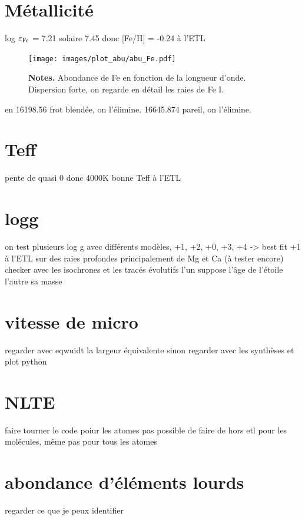 \section{Métallicité}

log $\varepsilon_{\rm Fe}$ = 7.21
solaire 7.45 
donc [Fe/H] = -0.24 à l'ETL 

\begin{figure}[htbp]
  \begin{center}
  \texttt{[image: images/plot\_abu/abu\_Fe.pdf]}
  \end{center}
  \textbf{Notes.}  Abondance de Fe en fonction de la longueur d'onde. Dispersion forte, on regarde en détail les raies de Fe I.
  \label{fig:abu_Fe}
\end{figure}
en 16198.56 frot blendée, on l'élimine.
16645.874 pareil, on l'élimine.

\section{Teff}
pente de quasi 0 donc 4000K bonne Teff à l'ETL  



\section{logg}
on test plusieurs log g avec différents modèles, +1, +2, +0, +3, +4 -> best fit +1 à l'ETL 
sur des raies profondes principalement de Mg et Ca (à tester encore)
checker avec les isochrones et les tracés évolutifs 
l'un suppose l'âge de l'étoile l'autre sa masse



\section{vitesse de micro}
regarder avec eqwuidt la largeur équivalente sinon regarder avec les synthèses et plot python

\section{NLTE}
faire tourner le code poiur les atomes
pas possible de faire de hors etl pour les molécules, même pas pour tous les atomes
\section{abondance d'éléments lourds}
regarder ce que je peux identifier

